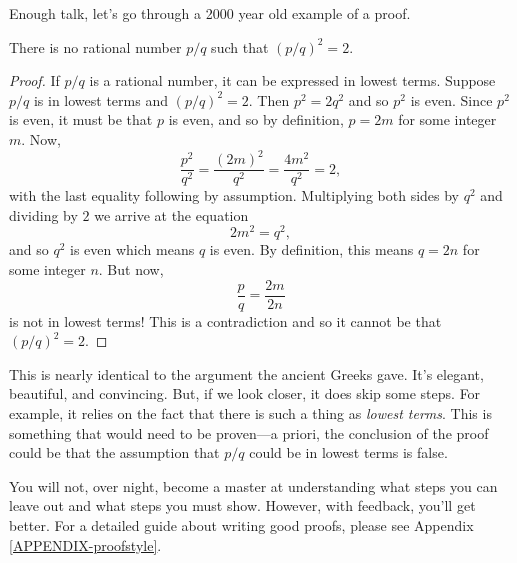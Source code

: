 	Enough talk, let's go through a 2000 year old example of a proof.
	\begin{theorem}
		There is no rational number $p/q$ such that $(p/q)^2=2$.
	\end{theorem}
	\begin{proof}
		If $p/q$ is a rational number, it can be expressed
		in lowest terms.
		Suppose $p/q$ is in lowest terms and $(p/q)^2=2$.  Then $p^2=2q^2$ and so $p^2$ is even.  Since
		$p^2$ is even, it must be that $p$ is even, and so by definition,
		$p=2m$ for some integer $m$.  Now,
		\[
			\frac{p^2}{q^2}=\frac{(2m)^2}{q^2}=\frac{4m^2}{q^2}=2,
		\]
		with the last equality following by assumption.  Multiplying both sides by $q^2$
		and dividing by $2$ we arrive at the equation
		\[
			2m^2=q^2,
		\]
		and so $q^2$ is even which means $q$ is even.  By definition, this means $q=2n$ for some integer $n$.
		But now,
		\[
			\frac{p}{q}=\frac{2m}{2n}
		\]
		is not in lowest terms!  This is a contradiction and so it cannot be that $(p/q)^2=2$.
	\end{proof}
	This is nearly identical to the argument the ancient Greeks gave.  It's elegant, beautiful,
	and convincing.  But, if we look closer, it does skip some steps.  For example, it relies on
	the fact that there is such a thing as \emph{lowest terms}.  This is something that would
	need to be proven---a priori, the conclusion of the proof could be that the assumption
	that $p/q$ could be in lowest terms is false.  
	
	You will not, over night,
	become a master at understanding
	what steps you can leave out and what steps you must show.  However, with feedback,
	you'll get better.
	For a detailed guide about writing good proofs, please see Appendix \ref{APPENDIX-proofstyle}.

